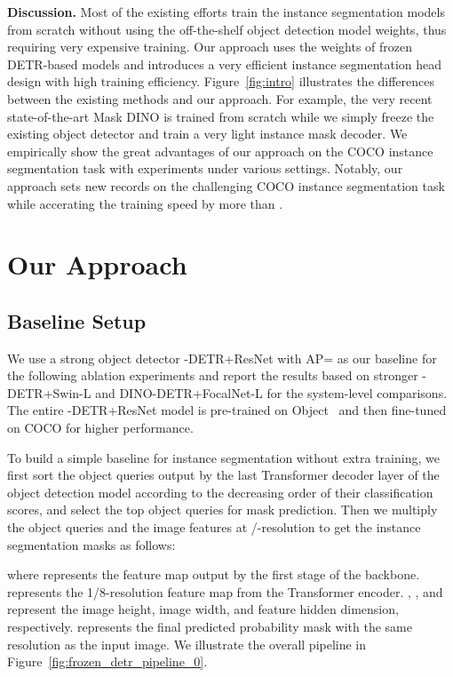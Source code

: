 \documentclass[10pt,twocolumn,letterpaper]{article}
\begin{document}
\noindent\textbf{Discussion.}
Most of the existing efforts train the instance segmentation models from scratch without using the off-the-shelf object detection model weights, thus requiring very expensive training.
Our approach uses the weights of frozen DETR-based models and introduces a very efficient instance segmentation head design with high training efficiency.
Figure~\ref{fig:intro} illustrates the differences between the existing methods and our approach.
For example, the very recent state-of-the-art Mask DINO is trained from scratch while we simply freeze the existing object detector and train a very light instance mask decoder.
We empirically show the great advantages of our approach on the COCO instance segmentation task with experiments under various settings.
Notably, our approach sets new records on the challenging COCO instance segmentation task while accerating the training speed by more than .


\section{Our Approach}

\subsection{Baseline Setup}
We use a strong object detector -DETR+ResNet with AP= as our baseline for the following ablation experiments and report the results based on stronger -DETR+Swin-L and DINO-DETR+FocalNet-L for the system-level comparisons. The entire -DETR+ResNet model is pre-trained on Object~\cite{shao2019objects365} and then fine-tuned on COCO for higher performance.

To build a simple baseline for instance segmentation without extra training, we first sort the object queries output by the last Transformer decoder layer of the object detection model according to the decreasing order of their classification scores, and select the top  object queries for mask prediction. Then we multiply the object queries  and the image features  at /-resolution to get the instance segmentation masks as follows:

where  represents the feature map output by the first stage of the backbone.  represents the 1/8-resolution feature map from the Transformer encoder. 
, , and  represent the image height, image width, and feature hidden dimension, respectively.  represents the final predicted probability mask with the same resolution as the input image.
We illustrate the overall pipeline in Figure~\ref{fig:frozen_detr_pipeline_0}.
\end{document}
